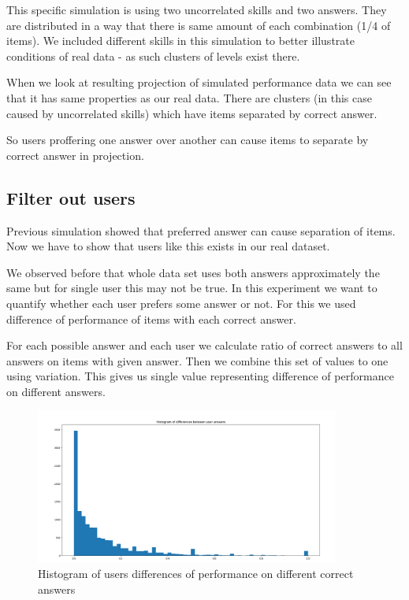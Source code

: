 \documentclass[
  digital, %
  table,   %
  nolof,     %
  nolot,     %
  nocover
]{fithesis3}
\begin{document}
This specific simulation is using two uncorrelated skills and two answers. They are distributed in a way that there is same amount of each combination (1/4 of items). We included different skills in this simulation to better illustrate conditions of real data - as such clusters of levels exist there.

When we look at resulting projection of simulated performance data we can see that it has same properties as our real data. There are clusters (in this case caused by uncorrelated skills) which have items separated by correct answer.


So users proffering one answer over another can cause items to separate by correct answer in projection.


\subsection{Filter out users}


Previous simulation showed that preferred answer can cause separation of items. Now we have to show that users like this exists in our real dataset.

We observed before that whole data set uses both answers approximately the same but for single user this may not be true. In this experiment we want to quantify whether each user prefers some answer or not. For this we used difference of performance of items with each correct answer.

For each possible answer and each user we calculate ratio of correct answers to all answers on items with given answer. Then we combine this set of values to one using variation. This gives us single value representing difference of performance on different answers.

\begin{figure}
  \includegraphics[width=10cm]{img/uneven_answers_hist}
  \caption{Histogram of users differences of performance on different correct answers}
  \label{fig:uneven_answers_hist}
\end{figure}
\end{document}
